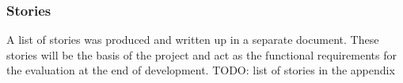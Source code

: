\subsubsection{Stories}
A list of stories was produced and written up in a separate document. These stories will be the basis of the project and act as the functional requirements for the evaluation at the end of development. TODO: list of stories in the appendix
\newpage